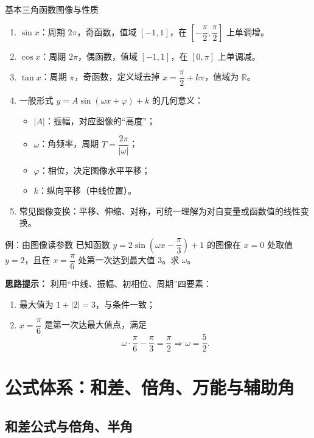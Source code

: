 \documentclass[a4paper,11pt]{ctexart}
\begin{document}
\begin{summarybox}{基本三角函数图像与性质}
\begin{enumerate}
  \item $\sin x$：周期 $2\pi$，奇函数，值域 $[-1,1]$，在 $\left[-\dfrac{\pi}{2},\dfrac{\pi}{2}\right]$ 上单调增。
  \item $\cos x$：周期 $2\pi$，偶函数，值域 $[-1,1]$，在 $\left[0,\pi\right]$ 上单调减。
  \item $\tan x$：周期 $\pi$，奇函数，定义域去掉 $x=\dfrac{\pi}{2}+k\pi$，值域为 $\mathbb{R}$。
  \item 一般形式 $y=A\sin(\omega x+\varphi)+k$ 的几何意义：
  \begin{itemize}
    \item $|A|$：振幅，对应图像的“高度”； 
    \item $\omega$：角频率，周期 $T=\dfrac{2\pi}{|\omega|}$；
    \item $\varphi$：相位，决定图像水平平移；
    \item $k$：纵向平移（中线位置）。
  \end{itemize}
  \item 常见图像变换：平移、伸缩、对称，可统一理解为对自变量或函数值的线性变换。
\end{enumerate}
\end{summarybox}

\begin{examplebox}{例：由图像读参数}
已知函数 $y=2\sin(\omega x-\dfrac{\pi}{3})+1$ 的图像在 $x=0$ 处取值 $y=2$，且在 $x=\dfrac{\pi}{6}$ 处第一次达到最大值 $3$。求 $\omega$。
\par\textbf{思路提示：} 利用“中线、振幅、初相位、周期”四要素：
\begin{enumerate}
  \item 最大值为 $1+|2|=3$，与条件一致；
  \item $x=\dfrac{\pi}{6}$ 是第一次达最大值点，满足
  \[
    \omega\cdot \frac{\pi}{6}-\frac{\pi}{3} = \frac{\pi}{2}
    \Rightarrow \omega=\frac{5}{2}.
  \]
\end{enumerate}
\end{examplebox}

\section{公式体系：和差、倍角、万能与辅助角}
\label{sec:formulas}

\subsection{和差公式与倍角、半角}
\end{document}
